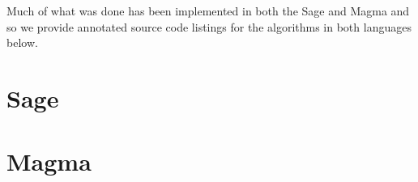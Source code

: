 \documentclass[a4paper,abstracton]{scrreprt}
\theoremstyle{definition}
\begin{document}
Much of what was done has been implemented in both the Sage and Magma and so we provide annotated source code listings for the algorithms in both languages below.
 
\section{Sage}


\section{Magma}



\nocite{*}


\end{document}
